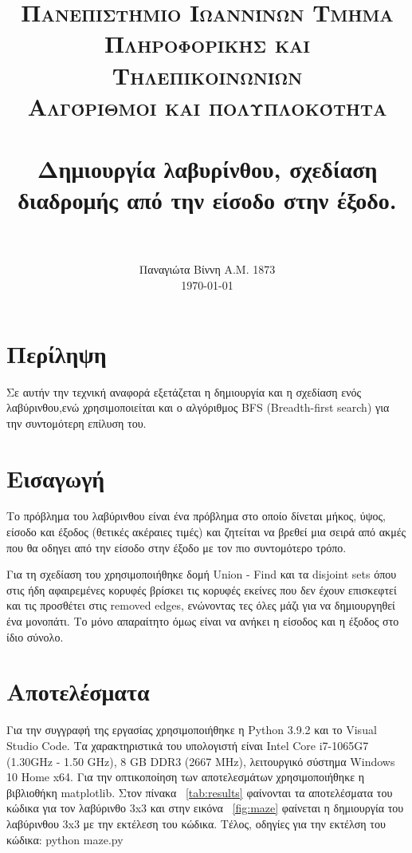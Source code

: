 \documentclass[paper=a4, fontsize=11pt]{scrartcl}
\title{
     \usefont{OT1}{bch}{b}{n}
     \normalfont \normalsize \textsc{Πανεπιστήμιο Ιωαννίνων Τμήμα Πληροφορικής και Τηλεπικοινωνίων} \\ [1em]
     \normalfont \normalsize \textsc{Αλγόριθμοι και πολυπλοκότητα} \\ [1em]
     \horrule{0.5pt} \\[0.4cm]
     \huge Δημιουργία λαβυρίνθου, σχεδίαση διαδρομής από την είσοδο στην έξοδο. \\
     \horrule{2pt} \\[0.5cm]
}
\author{
    \normalfont
         Παναγιώτα Βίννη  Α.Μ. 1873\\[-1pt]
         \today
}
\date{}
\numberwithin{equation}{section}		%
\numberwithin{figure}{section}			%
\numberwithin{table}{section}				%
\begin{document}
\maketitle

\section*{Περίληψη}
   Σε αυτήν την τεχνική αναφορά εξετάζεται η δημιουργία και η σχεδίαση ενός λαβύρινθου,ενώ χρησιμοποιείται και ο αλγόριθμος BFS (Breadth-first search) για την συντομότερη επίλυση του.
   
\section{Εισαγωγή}
    Το πρόβλημα του λαβύρινθου είναι ένα πρόβλημα στο
    οποίο δίνεται μήκος, ύψος, είσοδο και έξοδος (θετικές ακέραιες τιμές) και ζητείται να βρεθεί μια σειρά από ακμές που θα οδηγει από την είσοδο στην έξοδο με τον πιο συντομότερο τρόπο.
    
    Για τη σχεδίαση του χρησιμοποιήθηκε δομή Union - Find και τα disjoint sets όπου στις ήδη αφαιρεμένες κορυφές βρίσκει τις κορυφές εκείνες που δεν έχουν επισκεφτεί και τις προσθέτει στις removed edges, ενώνοντας τες όλες μάζι για να δημιουργηθεί ένα μονοπάτι. Το μόνο απαραίτητο όμως είναι να ανήκει η είσοδος και η έξοδος στο ίδιο σύνολο.
    
    

    
\section{Αποτελέσματα}
    Για την συγγραφή της εργασίας χρησιμοποιήθηκε η Python 3.9.2 και το Visual Studio Code. Τα χαρακτηριστικά του υπολογιστή είναι Intel Core i7-1065G7 (1.30GHz - 1.50 GHz), 8 GB DDR3 (2667 MHz), λειτουργικό σύστημα Windows 10 Home x64. Για την οπτικοποίηση των αποτελεσμάτων χρησιμοποιήθηκε η βιβλιοθήκη matplotlib. Στον πίνακα ~\ref{tab:results} φαίνονται τα αποτελέσματα του κώδικα για τον λαβύρινθο 3x3 και στην εικόνα ~\ref{fig:maze} φαίνεται η δημιουργία του λαβύρινθου 3x3 με την εκτέλεση του κώδικα. Τέλος, οδηγίες για την εκτέλση του κώδικα: python maze.py
\end{document}
